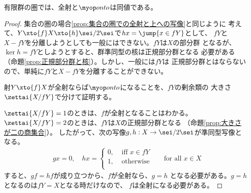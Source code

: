 	\begin{proposition}[有限群の圏での上への写像]
		有限群の圏では、全射と$\onto$は同値である。
	\label{prop:有限群の圏での上への写像} %
	\end{proposition} %
	\begin{proof} %
		集合の圏の場合\ref{prop:集合の圏での全射と上への写像}と同じように
		考えて、$Y\xto{f}X\xto{h}\sei/2\sei$で$hx=\jump{x\in fY}$として、
		$fY$と$X-fY$を分離しようとしても一般にはできない。$fY$は$X$の部分群
		となるが、$\ker h=fY$としようとすると、群準同型の核は正規部分群となる
		必要がある（命題\ref{prop:正規部分群と核}）。しかし、一般には$fY$は
		正規部分群とはならないので、単純に$fY$と$X-fY$を分離することができない。

		射$Y\xto{f}X$が全射ならば$\onto$になることを、$fY$の剰余類の
		大きさ$\zettai{\lcoset{X}{fY}}$で分けて証明する。

		$\zettai{\lcoset{X}{fY}}=1$のときは、$f$が全射となることはわかる。
		$\zettai{\lcoset{X}{fY}}=2$のときは、$fY$は$X$の正規部分群となる
		（命題\ref{prop:大きさが二の商集合}）。
		したがって、次の写像$g,h:X\to\sei/2\sei$が準同型写像となる。
		\begin{equation*}\begin{split} %
			g x = 0,\quad
			h x = \begin{cases}
				0, &\text{ iff } x\in fY \\
				1, &\text{ otherwise } \\
			\end{cases}
		\end{split}
			\quad\text{for all }x\in X
		\end{equation*} %
		すると、$gf=hf$が成り立つから、$f$が全射なら、$g=h$
		となる必要がある。$g=h$となるのは$fY=X$となる時だけなので、
		$f$は全射になる必要がある。


\end{proof}
